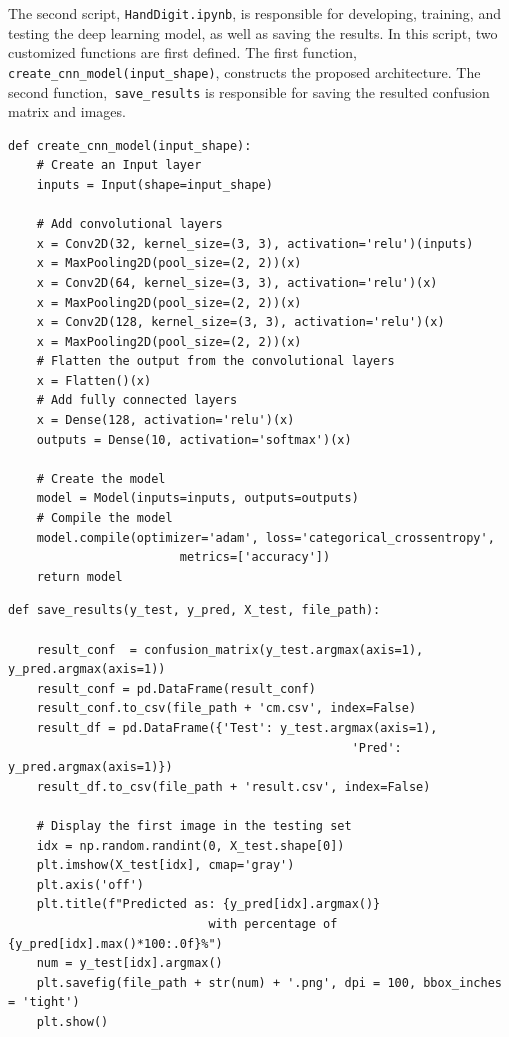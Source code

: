 The second script, \texttt{HandDigit.ipynb}, is responsible for developing, training, and testing the deep learning model, as well as saving the results. 
In this script, two customized functions are first defined. The first function, \texttt{create\_cnn\_model(input\_shape)}, constructs the proposed architecture. The second function,\texttt{ save\_results} is responsible for saving the resulted confusion matrix and images. 

\begin{solution}
\begin{lstlisting}
def create_cnn_model(input_shape):    
    # Create an Input layer
    inputs = Input(shape=input_shape)    
    
    # Add convolutional layers
    x = Conv2D(32, kernel_size=(3, 3), activation='relu')(inputs)
    x = MaxPooling2D(pool_size=(2, 2))(x)
    x = Conv2D(64, kernel_size=(3, 3), activation='relu')(x)
    x = MaxPooling2D(pool_size=(2, 2))(x)
    x = Conv2D(128, kernel_size=(3, 3), activation='relu')(x)
    x = MaxPooling2D(pool_size=(2, 2))(x)    
    # Flatten the output from the convolutional layers
    x = Flatten()(x)    
    # Add fully connected layers
    x = Dense(128, activation='relu')(x)
    outputs = Dense(10, activation='softmax')(x)
    
    # Create the model
    model = Model(inputs=inputs, outputs=outputs)
    # Compile the model
    model.compile(optimizer='adam', loss='categorical_crossentropy', 
                        metrics=['accuracy'])   
    return model
\end{lstlisting}  
\end{solution}

\begin{solution}
\begin{lstlisting}
def save_results(y_test, y_pred, X_test, file_path):    

    result_conf  = confusion_matrix(y_test.argmax(axis=1), y_pred.argmax(axis=1))
    result_conf = pd.DataFrame(result_conf)
    result_conf.to_csv(file_path + 'cm.csv', index=False)    
    result_df = pd.DataFrame({'Test': y_test.argmax(axis=1), 
                                                'Pred': y_pred.argmax(axis=1)})
    result_df.to_csv(file_path + 'result.csv', index=False)  
    
    # Display the first image in the testing set
    idx = np.random.randint(0, X_test.shape[0])
    plt.imshow(X_test[idx], cmap='gray')
    plt.axis('off')
    plt.title(f"Predicted as: {y_pred[idx].argmax()} 
                            with percentage of {y_pred[idx].max()*100:.0f}%")
    num = y_test[idx].argmax()
    plt.savefig(file_path + str(num) + '.png', dpi = 100, bbox_inches = 'tight')
    plt.show()
\end{lstlisting}  
\end{solution}

